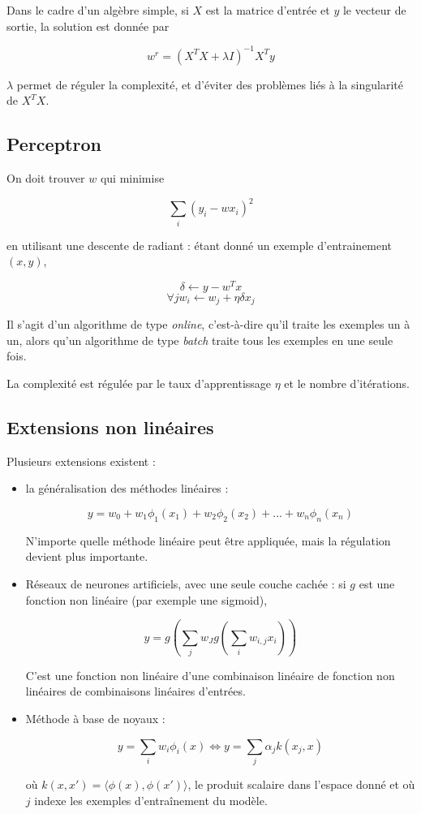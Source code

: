 		Dans le cadre d'un algèbre simple, si $X$ est la matrice d'entrée et $y$ le vecteur de sortie, la solution est donnée par
	
		$$w^r = (X^T X + \lambda I)^{-1}X^Ty$$
	
		$\lambda$ permet de réguler la complexité, et d'éviter des problèmes liés à la singularité de $X^TX$.
	
		\subsection{Perceptron}
	
		On doit trouver $w$ qui minimise
	
		$$\sum_i (y_i - wx_i)^2$$
	
		en utilisant une descente de radiant : étant donné un exemple d'entrainement $(x, y)$,
	
		$$\delta \leftarrow y - w^Tx$$
		$$\forall jw_i \leftarrow w_j + \eta \delta x_j$$
	
		Il s'agit d'un algorithme de type \textit{online}, c'est-à-dire qu'il traite les exemples un à un, alors qu'un algorithme de type \textit{batch} traite tous les exemples en une seule fois.
	
		La complexité est régulée par le taux d'apprentissage $\eta$ et le nombre d'itérations.
	
		\subsection{Extensions non linéaires}
	
		Plusieurs extensions existent :
	
		\begin{itemize}
			\item la généralisation des méthodes linéaires :
		
			$$y = w_0 + w_1 \phi_1(x_1) + w_2 \phi_2(x_2) + \dots + w_n \phi_n(x_n)$$
		
			N'importe quelle méthode linéaire peut être appliquée, mais la régulation devient plus importante.
		
			\item Réseaux de neurones artificiels, avec une seule couche cachée : si $g$ est une fonction non linéaire (par exemple une sigmoid),
		
			$$y = g(\sum_j w_J g(\sum_i w_{i, j} x_i))$$
		
			C'est une fonction non linéaire d'une combinaison linéaire de fonction non linéaires de combinaisons linéaires d'entrées.
		
			\item Méthode à base de noyaux :
		
			$$y = \sum_i w_i \phi_i(x) \Leftrightarrow y = \sum_j \alpha_j k(x_j, x)$$
		
			où $k(x, x') = \langle \phi(x), \phi(x') \rangle$, le produit scalaire dans l'espace donné et où $j$ indexe les exemples d'entraînement du modèle.
		\end{itemize}

